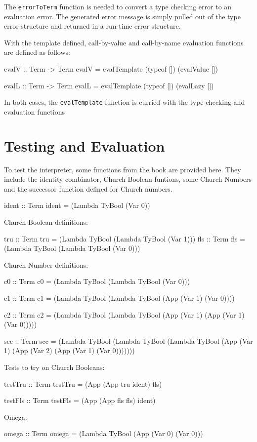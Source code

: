\documentclass[10pt]{article}
\begin{document}
The \texttt{errorToTerm} function is needed to convert a type checking
error to an evaluation error.  The generated error message is simply
pulled out of the type error structure and returned in a run-time
error structure.

With the template defined, call-by-value and call-by-name evaluation
functions are defined as follows:

\begin{code}
  evalV :: Term -> Term
  evalV = evalTemplate (typeof []) (evalValue [])

  evalL :: Term -> Term
  evalL = evalTemplate (typeof []) (evalLazy [])
\end{code}

In both cases, the \texttt{evalTemplate} function is curried with the
type checking and evaluation functions

\section{Testing and Evaluation}

To test the interpreter, some functions from the book are provided
here.  They include the identity combinator, Church Boolean funtions,
some Church Numbers and the successor function defined for Church
numbers.

\begin{code}
  ident :: Term
  ident = (Lambda TyBool (Var 0))
\end{code}

Church Boolean definitions:

\begin{code}
  tru :: Term
  tru = (Lambda TyBool (Lambda TyBool (Var 1)))
  fls :: Term
  fls = (Lambda TyBool (Lambda TyBool (Var 0)))
\end{code}

Church Number definitions:

\begin{code}
  c0 :: Term
  c0 = (Lambda TyBool (Lambda TyBool (Var 0)))

  c1 :: Term
  c1 = (Lambda TyBool (Lambda TyBool (App (Var 1) (Var 0))))

  c2 :: Term
  c2 = (Lambda TyBool (Lambda TyBool (App (Var 1) (App (Var 1) (Var 0)))))

  scc :: Term
  scc = (Lambda TyBool
         (Lambda TyBool
          (Lambda TyBool (App (Var 1)
                          (App (Var 2)
                           (App (Var 1) (Var 0)))))))
\end{code}

Tests to try on Church Booleans:

\begin{code}
  testTru :: Term
  testTru = (App (App tru ident) fls)

  testFls :: Term
  testFls = (App (App fls fls) ident)
\end{code}

Omega:

\begin{code}
  omega :: Term
  omega = (Lambda TyBool (App (Var 0) (Var 0)))
\end{code}
\end{document}
